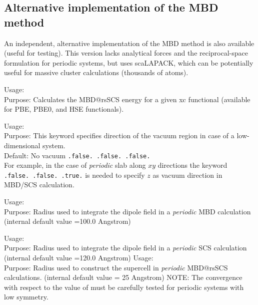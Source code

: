 \subsection*{Alternative implementation of the MBD method}

An independent, alternative implementation of the MBD method is also
available (useful for testing). This version lacks analytical forces
and the reciprocal-space formulation for periodic systems, but uses
scaLAPACK, which can be potentially useful for massive cluster
calculations (thousands of atoms). 

{
  \noindent
  Usage:  \\[1.0ex]
  Purpose: Calculates the MBD@rsSCS energy for a given xc functional
  (available for PBE, PBE0, and HSE functionals). 
\\
}

{
  \noindent
  Usage:   \\[1.0ex]
  Purpose: This keyword specifies direction of the vacuum region in case of a low-dimensional system.\\
  Default: No vacuum  \texttt{.false.  .false.  .false.} \\
  For example, in the case of {\it periodic} slab along $xy$ directions the keyword\\
   \texttt{.false.  .false.  .true.} is needed to specify  
  $z$ as vacuum direction in MBD/SCS calculation.
}

{
  \noindent
  Usage:   \\[1.0ex]
  Purpose: Radius used to integrate the dipole field in a {\it periodic} MBD calculation (internal default value =100.0 Angstrom)
}

{
  \noindent
  Usage:   \\[1.0ex]
  Purpose: Radius used to integrate the dipole field in a {\it periodic} SCS calculation (internal default value =120.0 Angstrom) 
}
{
  \noindent
  Usage:   \\[1.0ex]
  Purpose: Radius used to construct the supercell in {\it periodic} MBD@rsSCS calculations. (internal default value = 25 Angstrom)
  NOTE: The convergence with respect to the value of  must be carefully tested for periodic systems with low symmetry.
}

